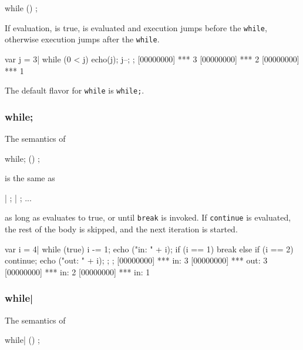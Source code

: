 \begin{urbiunchecked}
while ()
  ;
\end{urbiunchecked}

If  evaluation, is true,  is evaluated and
execution jumps before the \lstinline|while|, otherwise execution
jumps after the \lstinline|while|.

\begin{urbiscript}
var j = 3|
while (0 < j)
{
  echo(j);
  j--;
};
[00000000] *** 3
[00000000] *** 2
[00000000] *** 1
\end{urbiscript}

The default flavor for \lstinline|while| is \lstinline|while;|.

\subsubsection{while;}

The semantics of

\begin{urbiunchecked}
while; ()
  ;
\end{urbiunchecked}

\noindent
is the same as

\begin{urbiunchecked}
 |  ;  |  ; ...
\end{urbiunchecked}

\noindent
as long as  evaluates to true, or until \lstinline|break| is
invoked.  If \lstinline|continue| is evaluated, the rest of the body
is skipped, and the next iteration is started.

\begin{urbiscript}
{
  var i = 4|
  while (true)
  {
    i -= 1;
    echo ("in: " + i);
    if (i == 1)
      break
    else if (i == 2)
      continue;
    echo ("out: " + i);
  };
};
[00000000] *** in: 3
[00000000] *** out: 3
[00000000] *** in: 2
[00000000] *** in: 1
\end{urbiscript}


\subsubsection{while|}

The semantics of

\begin{urbiunchecked}
while| ()
  ;
\end{urbiunchecked}

